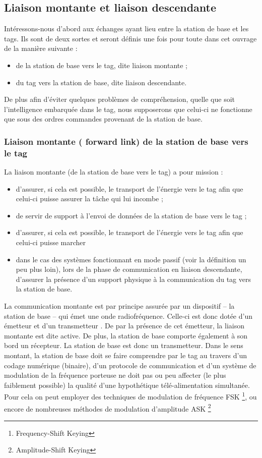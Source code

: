 \documentclass[11pt, a4paper, twoside]{book}
\begin{document}
\subsection{Liaison montante et liaison descendante}
Intéressons-nous d’abord aux échanges ayant lieu entre la station de base et les tags. Ils sont de deux sortes et seront définis une fois pour toute dans cet ouvrage de la manière suivante :
\begin{itemize}
\item de la station de base vers le tag, dite liaison montante ;
\item du tag vers la station de base, dite liaison descendante. \\
\end{itemize}
De plus afin d’éviter quelques problèmes de compréhension, quelle que soit l’intelligence embarquée dans le tag, nous supposerons que celui-ci ne fonctionne que sous des ordres commandes provenant de la station de base. 
\subsubsection{Liaison montante ( forward link) de la station de base vers le tag}
La liaison montante (de la station de base vers le tag) a pour mission :
\begin{itemize}
\item d'assurer, si cela est possible, le transport de l'énergie vers le tag afin que celui-ci puisse assurer la tâche qui lui incombe ;
\item de servir de support à l'envoi de données de la station de base vers le tag ;
\item d'assurer, si cela est possible, le transport de l'énergie vers le tag afin que celui-ci puisse marcher
\item dans le cas des systèmes fonctionnant en mode passif (voir la définition un peu plus loin), lors de la phase de communication en liaison descendante, d'assurer la présence d'un support physique à la communication du tag vers la station de base.\\
\end{itemize}

La communication montante est par principe assurée par un dispositif – la station de base – qui émet une onde radiofréquence. Celle-ci est donc dotée d’un émetteur et d'un transmetteur . De par la présence de cet émetteur, la liaison montante est dite active. De plus, la station de base comporte également à son bord un récepteur. La station de base est donc un transmetteur. Dans le sens montant, la station de base doit se faire comprendre par le tag au travers d’un codage numérique (binaire), d’un protocole de communication et d’un système de modulation de la fréquence porteuse ne doit pas ou peu affecter (le plus faiblement possible) la qualité d’une hypothétique télé-alimentation simultanée. Pour cela on peut employer des techniques de modulation de fréquence FSK \footnote{Frequency-Shift Keying}, ou encore de nombreuses méthodes de modulation d’amplitude ASK \footnote{Amplitude-Shift Keying}
\end{document}
